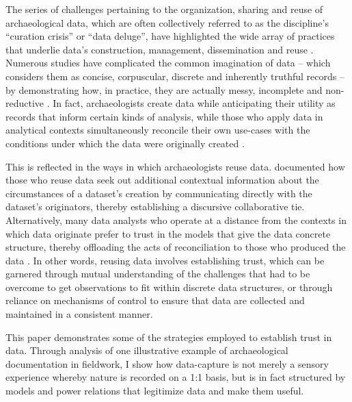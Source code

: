 The series of challenges pertaining to the organization, sharing and reuse of archaeological data, which are often collectively referred to as the discipline's ``curation crisis'' or ``data deluge'', have highlighted the wide array of practices that underlie data's construction, management, dissemination and reuse \parencites[]{bevan2012a}[]{huggett2022}[]{huggett2022a}.
Numerous studies have complicated the common imagination of data -- which considers them as concise, corpuscular, discrete and inherently truthful records -- by demonstrating how, in practice, they are actually messy, incomplete and non-reductive \parencites[cf.][]{huggett2022a}[]{voss2012}[]{dallas2015}[]{batist2024a}.
In fact, archaeologists create data while anticipating their utility as records that inform certain kinds of analysis, while those who apply data in analytical contexts simultaneously reconcile their own use-cases with the conditions under which the data were originally created \parencite[190-191]{dallas2015}.

This is reflected in the ways in which archaeologists reuse data.
\textcites[]{faniel2013}[]{atici2013} documented how those who reuse data seek out additional contextual information about the circumstances of a dataset's creation by communicating directly with the dataset's originators, thereby establishing a discursive collaborative tie.
Alternatively, many data analysts who operate at a distance from the contexts in which data originate prefer to trust in the models that give the data concrete structure, thereby offloading the acts of reconciliation to those who produced the data \parencites[]{huggett2022}.
In other words, reusing data involves establishing trust, which can be garnered through mutual understanding of the challenges that had to be overcome to get observations to fit within discrete data structures, or through reliance on mechanisms of control to ensure that data are collected and maintained in a consistent manner.

This paper demonstrates some of the strategies employed to establish trust in data.
Through analysis of one illustrative example of archaeological documentation in fieldwork, I show how data-capture is not merely a sensory experience whereby nature is recorded on a 1:1 basis, but is in fact structured by models and power relations that legitimize data and make them useful.

